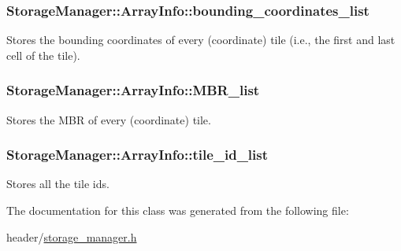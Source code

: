 \subsubsection[{bounding\+\_\+coordinates\+\_\+list}]{ Storage\+Manager\+::\+Array\+Info\+::bounding\+\_\+coordinates\+\_\+list\hspace{0.3cm}{\ttfamily [private]}}\label{classStorageManager_1_1ArrayInfo_a2ade6b75055a6bfcf8bbfb11ca7e3cfc}
Stores the bounding coordinates of every (coordinate) tile (i.\+e., the first and last cell of the tile). \hypertarget{classStorageManager_1_1ArrayInfo_a66111e092164f729d33231c0f0a62e77}{}
\subsubsection[{M\+B\+R\+\_\+list}]{ Storage\+Manager\+::\+Array\+Info\+::\+M\+B\+R\+\_\+list\hspace{0.3cm}{\ttfamily [private]}}\label{classStorageManager_1_1ArrayInfo_a66111e092164f729d33231c0f0a62e77}
Stores the M\+B\+R of every (coordinate) tile. \hypertarget{classStorageManager_1_1ArrayInfo_af1b6f3e3602d2defee5558795829d639}{}
\subsubsection[{tile\+\_\+id\+\_\+list}]{ Storage\+Manager\+::\+Array\+Info\+::tile\+\_\+id\+\_\+list\hspace{0.3cm}{\ttfamily [private]}}\label{classStorageManager_1_1ArrayInfo_af1b6f3e3602d2defee5558795829d639}
Stores all the tile ids. 

The documentation for this class was generated from the following file\+:\begin{DoxyCompactItemize}
\item 
header/\hyperlink{storage__manager_8h}{storage\+\_\+manager.\+h}\end{DoxyCompactItemize}
